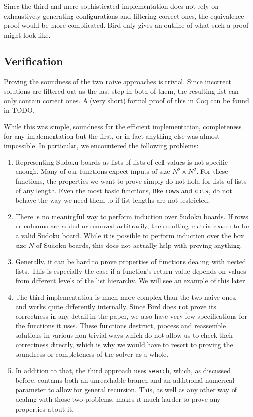 \documentclass[a4paper,11pt]{article}
\begin{document}
Since the third and more sophisticated implementation does not rely on exhaustively generating configurations and filtering correct ones, the equivalence proof would be more complicated. Bird only gives an outline of what such a proof might look like. 

\subsection{Verification}
Proving the soundness of the two naive approaches is trivial. Since incorrect solutions are filtered out as the last step in both of them, the resulting list can only contain correct ones. A (very short) formal proof of this in Coq can be found in TODO.

While this was simple, soundness for the efficient implementation, completeness for any implementation but the first, or in fact anything else was almost impossible. In particular, we encountered the following problems:
\begin{enumerate}
  \item Representing Sudoku boards as lists of lists of cell values is not specific enough. Many of our functions expect inputs of size \(N^2 \times N^2\). For these functions, the properties we want to prove simply do not hold for lists of lists of any length. Even the most basic functions, like \texttt{rows} and \texttt{cols}, do not behave the way we need them to if list lengths are not restricted.
  \item There is no meaningful way to perform induction over Sudoku boards. If rows or columns are added or removed arbitrarily, the resulting matrix ceases to be a valid Sudoku board. While it is possible to perform induction over the box size $N$ of Sudoku boards, this does not actually help with proving anything.
  \item Generally, it can be hard to prove properties of functions dealing with nested lists. This is especially the case if a function's return value depends on values from different levels of the list hierarchy. We will see an example of this later.
  \item The third implementation is much more complex than the two naive ones, and works quite differently internally. Since Bird does not prove its correctness in any detail in the paper, we also have very few specifications for the functions it uses. These functions destruct, process and reassemble solutions in various non-trivial ways which do not allow us to check their correctness directly, which is why we would have to resort to proving the soundness or completeness of the solver as a whole.
  \item In addition to that, the third approach uses \texttt{search}, which, as discussed before, contains both an unreachable branch and an additional numerical parameter to allow for general recursion. This, as well as any other way of dealing with those two problems, makes it much harder to prove any properties about it.
\end{enumerate}
\end{document}
